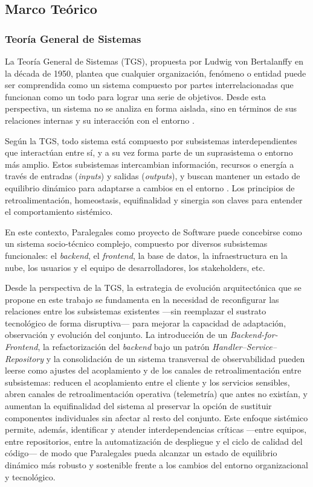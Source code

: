 \subsection{Marco Teórico}

\subsubsection{Teoría General de Sistemas}

La Teoría General de Sistemas (TGS), propuesta por Ludwig von Bertalanffy en la década de 1950, plantea que cualquier organización, fenómeno o entidad puede ser comprendida como un sistema compuesto por partes interrelacionadas que funcionan como un todo para lograr una serie de objetivos. Desde esta perspectiva, un sistema no se analiza en forma aislada, sino en términos de sus relaciones internas y su interacción con el entorno \cite{Bertalanffy1968}.

Según la TGS, todo sistema está compuesto por subsistemas interdependientes que interactúan entre sí, y a su vez forma parte de un suprasistema o entorno más amplio. Estos subsistemas intercambian información, recursos o energía a través de entradas (\textit{inputs}) y salidas (\textit{outputs}), y buscan mantener un estado de equilibrio dinámico para adaptarse a cambios en el entorno \cite{Bertalanffy1968}. Los principios de retroalimentación, homeostasis, equifinalidad y sinergia son claves para entender el comportamiento sistémico.

En este contexto, Paralegales como proyecto de Software puede concebirse como un sistema socio-técnico complejo, compuesto por diversos subsistemas funcionales: el \textit{backend}, el \textit{frontend}, la base de datos, la infraestructura en la nube, los usuarios y el equipo de desarrolladores, los stakeholders, etc.

Desde la perspectiva de la TGS, la estrategia de evolución arquitectónica que se propone en este trabajo se fundamenta en la necesidad de reconfigurar las relaciones entre los subsistemas existentes —sin reemplazar el sustrato tecnológico de forma disruptiva— para mejorar la capacidad de adaptación, observación y evolución del conjunto. La introducción de un \textit{Backend-for-Frontend}, la refactorización del \textit{backend} bajo un patrón \textit{Handler--Service--Repository} y la consolidación de un sistema transversal de observabilidad pueden leerse como ajustes del acoplamiento y de los canales de retroalimentación entre subsistemas: reducen el acoplamiento entre el cliente y los servicios sensibles, abren canales de retroalimentación operativa (telemetría) que antes no existían, y aumentan la equifinalidad del sistema al preservar la opción de sustituir componentes individuales sin afectar al resto del conjunto. Este enfoque sistémico permite, además, identificar y atender interdependencias críticas —entre equipos, entre repositorios, entre la automatización de despliegue y el ciclo de calidad del código— de modo que Paralegales pueda alcanzar un estado de equilibrio dinámico más robusto y sostenible frente a los cambios del entorno organizacional y tecnológico.

